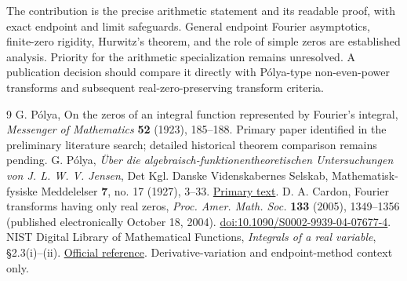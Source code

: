 \documentclass[11pt]{article}
\theoremstyle{remark}\newtheorem{remark}[theorem]{Remark}
\begin{document}
The contribution is the precise arithmetic statement and its
readable proof, with exact endpoint and limit safeguards. General
endpoint Fourier asymptotics, finite-zero rigidity, Hurwitz's theorem,
and the role of simple zeros are established analysis. Priority for
the arithmetic specialization remains unresolved. A publication
decision should compare it directly with P\'olya-type non-even-power
transforms and subsequent real-zero-preserving transform criteria.

\clearpage
\begin{thebibliography}{9}
 G. P\'olya,
On the zeros of an integral function represented by Fourier's integral,
\emph{Messenger of Mathematics} \textbf{52} (1923), 185--188.
Primary paper identified in the preliminary literature search;
detailed historical theorem comparison remains pending.
 G. P\'olya,
\emph{\"Uber die algebraisch-funktionentheoretischen Untersuchungen
von J. L. W. V. Jensen},
Det Kgl. Danske Videnskabernes Selskab,
Mathematisk-fysiske Meddelelser \textbf{7}, no. 17 (1927), 3--33.
\href{https://gymarkiv.sdu.dk/MFM/kdvs/mfm\%201-9/mfm-7-17.pdf}{Primary text}.
 D. A. Cardon,
Fourier transforms having only real zeros,
\emph{Proc. Amer. Math. Soc.} \textbf{133} (2005), 1349--1356
(published electronically October 18, 2004).
\href{https://doi.org/10.1090/S0002-9939-04-07677-4}{doi:10.1090/S0002-9939-04-07677-4}.
 NIST Digital Library of Mathematical Functions,
\emph{Integrals of a real variable}, \S2.3(i)--(ii).
\href{https://dlmf.nist.gov/2.3}{Official reference}.
Derivative-variation and endpoint-method context only.
\end{thebibliography}
\end{document}
